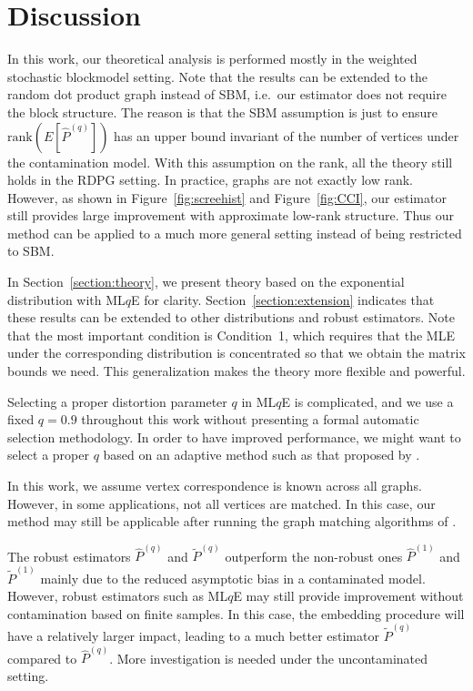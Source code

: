 \documentclass[a4paper]{article}
\renewcommand{\hat}{\widehat}
\begin{document}
\section{Discussion}

In this work, our theoretical analysis is performed mostly in the weighted stochastic blockmodel setting. Note that the results can be extended to the random dot product graph instead of SBM, i.e.\ our estimator does not require the block structure. The reason is that the SBM assumption is just to ensure $\mathrm{rank}(E[\hat{P}^{(q)}])$ has an upper bound invariant of the number of vertices under the contamination model. With this assumption on the rank, all the theory still holds in the RDPG setting. In practice, graphs are not exactly low rank. However, as shown in Figure~\ref{fig:screehist} and Figure~\ref{fig:CCI}, our estimator still provides large improvement with approximate low-rank structure. Thus our method can be applied to a much more general setting instead of being restricted to SBM.

In Section~\ref{section:theory}, we present theory based on the exponential distribution with ML$q$E for clarity. Section~\ref{section:extension} indicates that these results can be extended to other distributions and robust estimators. Note that the most important condition is Condition~1, which requires that the MLE under the corresponding distribution is concentrated so that we obtain the matrix bounds we need. This generalization makes the theory more flexible and powerful.

Selecting a proper distortion parameter $q$ in ML$q$E is complicated, and we use a fixed $q = 0.9$ throughout this work without presenting a formal automatic selection methodology. In order to have improved performance, we might want to select a proper $q$ based on an adaptive method such as that proposed by \citet{qin2017robust}.

In this work, we assume vertex correspondence is known across all graphs. However, in some applications, not all vertices are matched. In this case, our method may still be applicable after running the graph matching algorithms of \citep{lyzinski2016graph, lyzinski2015spectral, lyzinski2014seeded}.

The robust estimators $\hat{P}^{(q)}$ and $\widetilde{P}^{(q)}$ outperform the non-robust ones $\hat{P}^{(1)}$ and $\widetilde{P}^{(1)}$ mainly due to the reduced asymptotic bias in a contaminated model. However, robust estimators such as ML$q$E may still provide improvement without contamination based on finite samples. In this case, the embedding procedure will have a relatively larger impact, leading to a much better estimator $\widetilde{P}^{(q)}$ compared to $\hat{P}^{(q)}$. More investigation is needed under the uncontaminated setting.
\end{document}
